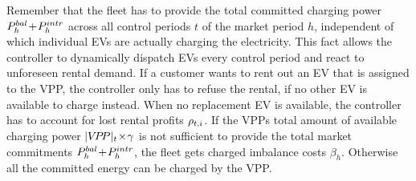 \documentclass[a4paper, 12pt]{article}
\begin{document}
Remember that the fleet has to provide the total committed charging power
\(P^{bal}_{h}\!+\!P^{intr}_{h}\) across all control periods \(t\) of the market period \(h\),
independent of which individual EVs are actually charging the electricity. This
fact allows the controller to dynamically dispatch EVs every control period and
react to unforeseen rental demand. If a customer wants to rent out an EV that is
assigned to the VPP, the controller only has to refuse the rental, if no other
EV is available to charge instead. When no replacement EV is available, the
controller has to account for lost rental profits \(\rho_{t,i}\). If the VPPs total
amount of available charging power \(|{V\!P\!P}|_{t}\!\times\!\gamma\) is not sufficient to
provide the total market commitments \(P^{bal}_{h}\!+\!P^{intr}_{h}\), the fleet gets charged
imbalance costs \(\beta_{h}\). Otherwise all the committed energy can be charged
by the VPP.
\end{document}
